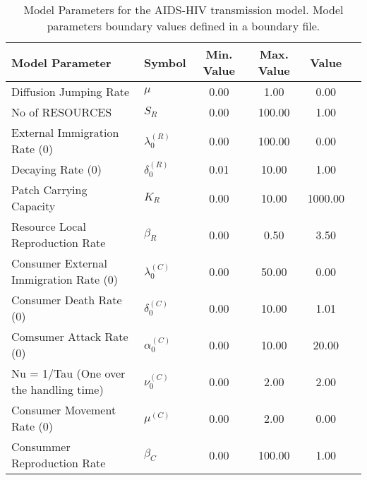 \begin{table}
\centering
\begin{tabular}{p{5cm}lcccc}
{\bf Model Parameter} & {\bf Symbol} & {\bf Min. Value} & {\bf Max. Value} & {\bf Value}\\
\hline\hline
Diffusion Jumping Rate & $\mu$ & 0.00 & 1.00 & 0.00\\
No of RESOURCES & $S_R$ & 0.00 & 100.00 & 1.00\\
External Immigration Rate (0) & $\lambda^{(R)}_0$ & 0.00 & 100.00 & 0.00\\
Decaying Rate (0) & $\delta^{(R)}_0$ & 0.01 & 10.00 & 1.00\\
Patch Carrying Capacity & $K_R$ & 0.00 & 10.00 & 1000.00\\
Resource Local Reproduction Rate & $\beta_R$ & 0.00 & 0.50 & 3.50\\
Consumer External Immigration Rate (0) & $\lambda^{(C)}_0$ & 0.00 & 50.00 & 0.00\\
Consumer Death Rate (0) & $\delta^{(C)}_0$ & 0.00 & 10.00 & 1.01\\
Comsumer Attack Rate (0) & $\alpha^{(C)}_0$ & 0.00 & 10.00 & 20.00\\
Nu = 1/Tau (One over the handling time) & $\nu^{(C)}_0$ & 0.00 & 2.00 & 2.00\\
Consumer Movement Rate (0) & $\mu^{(C)}$ & 0.00 & 2.00 & 0.00\\
Consummer Reproduction Rate & $\beta_C$ & 0.00 & 100.00 & 1.00\\
\hline\hline
\end{tabular}
\caption{Model Parameters for the AIDS-HIV transmission model. Model parameters boundary values defined in a boundary file.}
\end{table}
